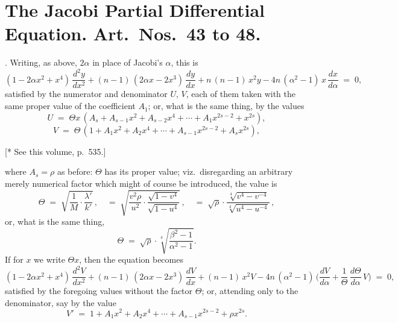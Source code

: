 \documentclass[11pt]{article}
\begin{document}
\bigskip

\section*{The Jacobi Partial Differential Equation. Art.\ Nos.\ 43 to 48.}

. Writing, as above, $2\alpha$ in place of Jacobi's $\alpha$, this is
\[
(1 - 2\alpha x^2 + x^4)\,\frac{d^2 y}{dx^2} + (n - 1)\,(2\alpha x - 2 x^3)\,\frac{d y}{dx} + n\,(n - 1)\,x^2 y - 4 n\,(\alpha^2 - 1)\,x\,\frac{d x}{d\alpha} \;=\; 0,
\]
satisfied by the numerator and denominator $U$, $V$, each of them taken with the same proper value of the coefficient $A_1$; or, what is the same thing, by the values
\[
U \;=\; \Theta x\,(A_s + A_{s-1}x^2 + A_{s-2}x^4 + \cdots + A_1 x^{2s-2} + x^{2s}),
\]
\[
V \;=\; \Theta\,(1 + A_1 x^2 + A_2 x^4 + \cdots + A_{s-1}x^{2s-2} + A_s x^{2s}),
\]

\hfill {\footnotesize [* See this volume, p.~535.]}

\newpage

\noindent where $A_s = \rho$ as before: $\Theta$ has its proper value; viz.\ disregarding an arbitrary merely numerical factor which might of course be introduced, the value is
\[
\Theta \;=\; \sqrt{\frac{1}{M}\cdot\frac{\lambda'}{k'}}\,,\quad =\;\sqrt{\frac{v^2\rho}{u^2}\cdot\frac{\sqrt{1 - v^4}}{\sqrt{1 - u^4}}}\,,\quad =\;\sqrt{\rho}\cdot\frac{\sqrt[4]{v^4 - v^{-4}}}{\sqrt[4]{u^4 - u^{-4}}}\,,
\]
or, what is the same thing,
\[
\Theta \;=\; \sqrt{\rho}\cdot\sqrt[4]{\frac{\beta^2 - 1}{\alpha^2 - 1}}.
\]
If for $x$ we write $\Theta x$, then the equation becomes
\[
(1 - 2\alpha x^2 + x^4)\,\frac{d^2 V}{dx^2} + (n - 1)\,(2\alpha x - 2 x^3)\,\frac{d V}{dx} + (n - 1)\,x^2 V - 4 n\,(\alpha^2 - 1)\,\bigl(\frac{d V}{d\alpha} + \frac{1}{\Theta}\,\frac{d\Theta}{d\alpha}\,V\bigr) \;=\; 0,
\]
satisfied by the foregoing values without the factor $\Theta$; or, attending only to the denominator, say by the value
\[
V' \;=\; 1 + A_1 x^2 + A_2 x^4 + \cdots + A_{s-1}x^{2s-2} + \rho x^{2s}.
\]

\medskip
\end{document}
